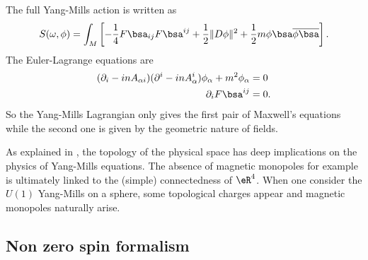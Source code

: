  The full Yang-Mills action is written as
\[
  S(\omega,\phi)=\int_M\left[  -\frac{1}{4}F\bsa_{ij}F\bsa^{ij}+\frac{1}{2}\|D\phi\|^2+\frac{1}{2} m\phi\bsa\overline{\phi\bsa}  \right].
\]
The Euler-Lagrange equations are
\begin{subequations}
\begin{align}
(\partial_i-inA_{\alpha i})(\partial^i-inA_{\alpha}^i)\phi_{\alpha}+m^2\phi_{\alpha}&=0\\
        \partial_iF\bsa^{ij}&=0.
\end{align}
\end{subequations}
So the Yang-Mills Lagrangian only gives the first pair of Maxwell's equations while the second one is given by the geometric nature of fields.

As explained in \cite{AlexModaveII}, the topology of the physical space has deep implications on the physics of Yang-Mills equations. The absence of magnetic monopoles for example is ultimately linked to the (simple) connectedness of $\eR^4$. When one consider the $U(1)$ Yang-Mills on a sphere, some topological charges appear and magnetic monopoles naturally arise.

\subsection{Non zero spin formalism}

